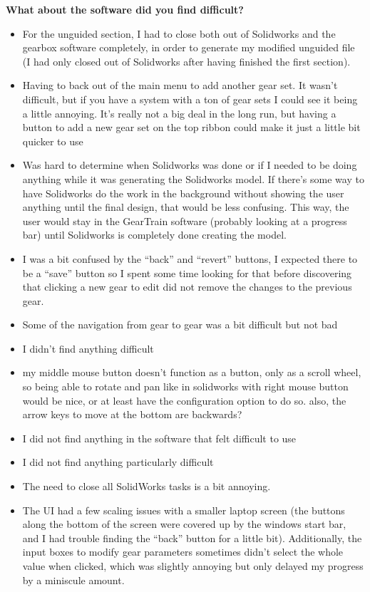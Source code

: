 \noindent\textbf{What about the software did you find difficult?}
\begin{itemize}
    \item For the unguided section, I had to close both out of Solidworks and the gearbox software completely, in order to generate my modified unguided file (I had only closed out of Solidworks after having finished the first section).
    \item Having to back out of the main menu to add another gear set. It wasn't difficult, but if you have a system with a ton of gear sets I could see it being a little annoying. It's really not a big deal in the long run, but having a button to add a new gear set on the top ribbon could make it just a little bit quicker to use
    \item Was hard to determine when Solidworks was done or if I needed to be doing anything while it was generating the Solidworks model. If there's some way to have Solidworks do the work in the background without showing the user anything until the final design, that would be less confusing. This way, the user would stay in the GearTrain software (probably looking at a progress bar) until Solidworks is completely done creating the model.
    \item I was a bit confused by the ``back'' and ``revert'' buttons, I expected there to be a ``save'' button so I spent some time looking for that before discovering that clicking a new gear to edit did not remove the changes to the previous gear.
    \item Some of the navigation from gear to gear was a bit difficult but not bad
    \item I didn't find anything difficult
    \item my middle mouse button doesn't function as a button, only as a scroll wheel, so being able to rotate and pan like in solidworks with right mouse button would be nice, or at least have the configuration option to do so. also, the arrow keys to move at the bottom are backwards?
    \item I did not find anything in the software that felt difficult to use
    \item I did not find anything particularly difficult
    \item The need to close all SolidWorks tasks is a bit annoying.
    \item The UI had a few scaling issues with a smaller laptop screen (the buttons along the bottom of the screen were covered up by the windows start bar, and I had trouble finding the ``back'' button for a little bit). Additionally, the input boxes to modify gear parameters sometimes didn't select the whole value when clicked, which was slightly annoying but only delayed my progress by a miniscule amount.

\end{itemize}
